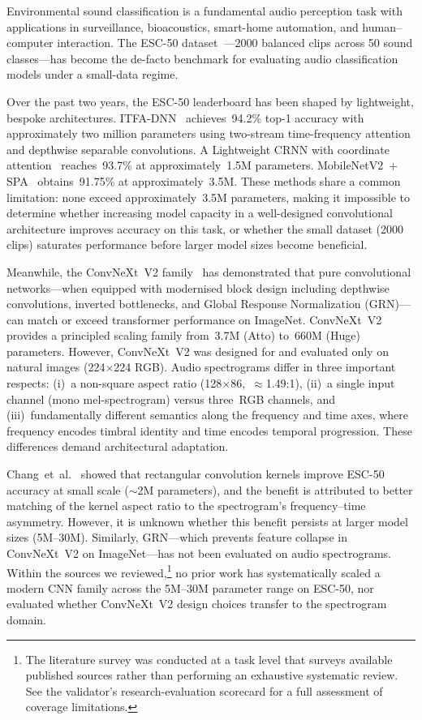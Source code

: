 \documentclass{article}
\begin{document}
Environmental sound classification is a fundamental audio perception task with
applications in surveillance, bioacoustics, smart-home automation, and
human--computer interaction. The ESC-50 dataset~\cite{piczark2015esc50}---2000
balanced clips across 50 sound classes---has become the de-facto benchmark for
evaluating audio classification models under a small-data regime.

Over the past two years, the ESC-50 leaderboard has been shaped by lightweight,
bespoke architectures. ITFA-DNN~\cite{chen2025itfa} achieves~94.2\% top-1
accuracy with approximately two million parameters using two-stream
time-frequency attention and depthwise separable convolutions. A Lightweight
CRNN with coordinate attention~\cite{crnncoordatt2026} reaches~93.7\% at
approximately~1.5M parameters. MobileNetV2~+
SPA~\cite{mobilenetv2spa2025} obtains~91.75\% at approximately~3.5M. These
methods share a common limitation: none exceed approximately~3.5M parameters,
making it impossible to determine whether increasing model capacity in a
well-designed convolutional architecture improves accuracy on this task, or
whether the small dataset (2000 clips) saturates performance before larger
model sizes become beneficial.

Meanwhile, the ConvNeXt~V2 family~\cite{woo2023convnextv2} has demonstrated
that pure convolutional networks---when equipped with modernised block design
including depthwise convolutions, inverted bottlenecks, and Global Response
Normalization (GRN)---can match or exceed transformer performance on ImageNet.
ConvNeXt~V2 provides a principled scaling family from~3.7M (Atto) to~660M
(Huge) parameters. However, ConvNeXt~V2 was designed for and evaluated only on
natural images (224$\times$224 RGB). Audio spectrograms differ in three
important respects: (i)~a non-square aspect ratio (128$\times$86,~$\approx$1.49:1),
(ii)~a single input channel (mono mel-spectrogram) versus three~RGB channels,
and (iii)~fundamentally different semantics along the frequency and time axes,
where frequency encodes timbral identity and time encodes temporal progression.
These differences demand architectural adaptation.

Chang~et~al.~\cite{chang2026rectangular} showed that rectangular convolution
kernels improve ESC-50 accuracy at small scale ($\sim$2M parameters), and the
benefit is attributed to better matching of the kernel aspect ratio to the
spectrogram's frequency--time asymmetry. However, it is unknown whether this
benefit persists at larger model sizes (5M--30M). Similarly, GRN---which
prevents feature collapse in ConvNeXt~V2 on ImageNet---has not been evaluated
on audio spectrograms. Within the sources we reviewed,\footnote{%
  The literature survey was conducted at a task level that surveys available
  published sources rather than performing an exhaustive systematic review.
  See the validator's research-evaluation scorecard for a full assessment of
  coverage limitations.}
no prior work has systematically scaled a modern CNN family across the 5M--30M
parameter range on ESC-50, nor evaluated whether ConvNeXt~V2 design choices
transfer to the spectrogram domain.
\end{document}
